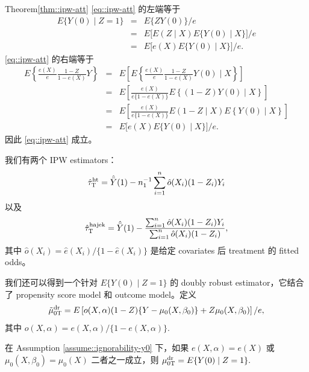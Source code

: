 \begin{myproof}{Theorem}{\ref{thm::ipw-att}} 
\eqref{eq::ipw-att} 的左端等于
\begin{eqnarray*}
E\{ Y(0) \mid Z=1 \} &=& E\{ ZY(0)   \} /e \\
&=& E\big[  E( Z \mid X) E\{ Y(0) \mid X  \} \big] /e \\
&=&E\big[ e(X)  E\{ Y(0) \mid X  \} \big] /e . 
\end{eqnarray*}
\eqref{eq::ipw-att} 的右端等于
\begin{eqnarray*}
E\left\{         \frac{e(X)}{e}  \frac{1-Z}{1-e(X)} Y \right\} 
&=& E\left[  E\left\{         \frac{e(X)}{e}  \frac{1-Z}{1-e(X)} Y(0) \mid X \right\}  \right]\\
&=& E\left[   \frac{e(X)}{e \{1-e(X)\} }   E\left\{       (1-Z)Y(0) \mid X \right\}  \right]\\
&=& E\left[   \frac{e(X)}{e \{1-e(X)\} }   E(      1-Z\mid X )   E\left\{       Y(0) \mid X \right\}  \right]\\
&=& E\big[ e(X)  E\{ Y(0) \mid X  \} \big] /e .  
\end{eqnarray*}
因此 \eqref{eq::ipw-att} 成立。
\end{myproof}




我们有两个 IPW estimators：
$$
\hat{\tau}_\textsc{T}^\text{ht} =  \hat{\bar{Y}}(1) - n_1^{-1} \sum_{i=1}^n \hat{o}(X_i) (1-Z_i) Y_i
$$
以及
$$
\hat{\tau}_\textsc{T}^\text{hajek} = \hat{\bar{Y}}(1) 
- \frac{  \sum_{i=1}^n \hat{o}(X_i) (1-Z_i) Y_i }{ \sum_{i=1}^n \hat{o}(X_i) (1-Z_i) } ,
$$
其中 $\hat{o}(X_i) = \hat{e}(X_i) / \{ 1 - \hat{e}(X_i)  \} $ 是给定 covariates 后 treatment 的 fitted odds。

 
 



我们还可以得到一个针对 $E\{  Y(0)\mid Z=1\}$ 的 doubly robust estimator，它结合了 propensity score model 和 outcome model。定义
\begin{eqnarray}
\label{eq::dr-att-mu0}
\tilde{\mu}_{0\textsc{T}}^\textup{dr} = E\left[ o(X,\alpha)  (1-Z) \{ Y - \mu_0(X, \beta_0) \}     + Z  \mu_0(X, \beta_0) \right] /e, 
\end{eqnarray}
其中 $o(X,\alpha)  = e(X,\alpha)/ \{ 1 - e(X,\alpha)\}.$

\begin{theorem}
\label{thm::dr-att}
在 Assumption \ref{assume::ignorability-y0} 下，如果 $ e(X,\alpha) = e(X)$ 或 $\mu_0(X, \beta_0)=\mu_0(X) $ 二者之一成立，则 $\mu_{0\textsc{T}}^\text{dr}  = E\{ Y(0) \mid Z=1 \}.$
\end{theorem}


